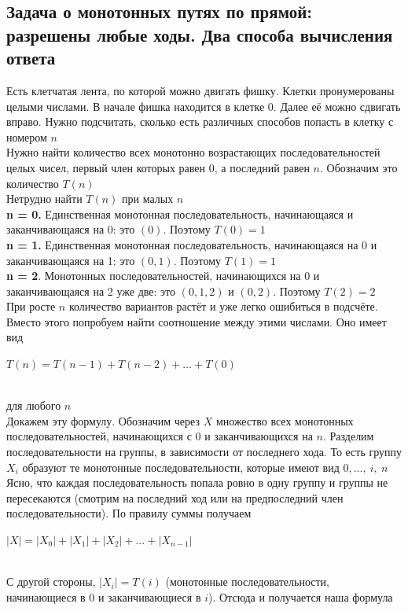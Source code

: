 \documentclass[a4paper]{article}
\begin{document}
\subsection{Задача о монотонных путях по прямой: разрешены любые ходы. Два способа вычисления ответа}
Есть клетчатая лента, по которой можно двигать фишку. Клетки пронумерованы целыми числами. В начале фишка находится в клетке 0. Далее её можно сдвигать вправо. Нужно подсчитать, сколько есть различных способов попасть в клетку с номером $n$\\[2mm]
\indent Нужно найти количество всех монотонно возрастающих последовательностей целых чисел, первый член которых равен 0, а последний равен $n$. Обозначим это количество $T(n)$\\[2mm]
\indent Нетрудно найти $T(n)$ при малых $n$\\[2mm]
\indent \textbf{n = 0.} Единственная монотонная последовательность, начинающаяся и заканчивающаяся на 0: это $(0)$. Поэтому $T (0) = 1$\\[2mm]
\indent \textbf{n = 1.} Единственная монотонная последовательность, начинающаяся на 0 и заканчивающаяся на 1: это $(0, 1)$. Поэтому $T (1) = 1$\\[2mm]
\indent \textbf{n = 2}. Монотонных последовательностей, начинающихся на 0 и заканчивающаяся на 2 уже две: это $(0,1,2)$ и $(0,2)$. Поэтому $T(2) = 2$\\[2mm]
\indent При росте $n$ количество вариантов растёт и уже легко ошибиться в подсчёте.
Вместо этого попробуем найти соотношение между этими числами. Оно имеет вид\\[2mm]
\centerline{$T(n)=T(n-1)+T(n-2)+\ldots+T(0)$}\\[2mm]
для любого $n$\\[2mm]
\indent Докажем эту формулу. Обозначим через $X$ множество всех монотонных последовательностей, начинающихся с 0 и заканчивающихся на $n$. Разделим последовательности на группы, в зависимости от последнего хода. То есть группу $X_i$ образуют те монотонные последовательности, которые имеют вид $0,\ldots,\ i,\ n$\\[2mm]
\indent Ясно, что каждая последовательность попала ровно в одну группу и группы не пересекаются (смотрим на последний ход или на предпоследний член последовательности). По правилу суммы получаем\\[2mm]
\centerline{$|X|=|X_0|+|X_1|+|X_2|+\ldots+|X_{n-1}|$}\\[2mm]
\label{sec:2.18}С другой стороны, $|X_i|=T(i)$ (монотонные последовательности, начинающиеся в 0 и заканчивающиеся в $i$). Отсюда и получается наша формула\\[2mm]
\end{document}
